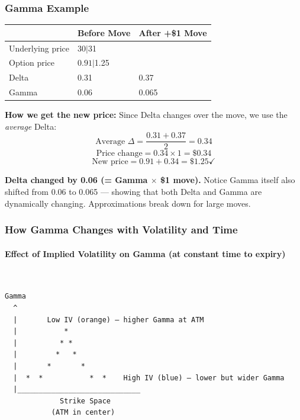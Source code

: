 \documentclass[12pt,openany]{book}
\begin{document}
\subsubsection{Gamma Example}

\begin{center}
\scriptsize
\setlength{\tabcolsep}{3pt}
\begin{tabular}{|L{4.1cm}|L{4.1cm}|L{4.1cm}|}
\hline
\textbf{} & \textbf{Before Move} & \textbf{After +\$1 Move} \\
\hline
Underlying price & \(30 | \)31 &  \\
\hline
Option price & \(0.91 | \)1.25 &  \\
\hline
Delta & 0.31 & 0.37 \\
\hline
Gamma & 0.06 & 0.065 \\
\hline
\end{tabular}
\end{center}

\textbf{How we get the new price:}
Since Delta changes over the move, we use the \emph{average} Delta:
\[
\text{Average } \Delta = \frac{0.31 + 0.37}{2} = 0.34
\]
\[
\text{Price change} = 0.34 \times 1 = \$0.34
\]
\[
\text{New price} = 0.91 + 0.34 = \$1.25 \checkmark
\]

\textbf{Delta changed by 0.06 (= Gamma \(\times\) \$1 move).} Notice Gamma itself also shifted from 0.06 to 0.065 — showing that both Delta and Gamma are dynamically changing. Approximations break down for large moves.

\subsubsection{How Gamma Changes with Volatility and Time}

\paragraph{Effect of Implied Volatility on Gamma (at constant time to expiry)}\mbox{}\\

\begin{center}
\begin{Verbatim}[fontsize=\small,breaklines=true]
Gamma
  ^
  |       Low IV (orange) — higher Gamma at ATM
  |           *
  |          * *
  |         *   *
  |       *       *
  |  *  *           *  *    High IV (blue) — lower but wider Gamma
  |_____________________________
             Strike Space
           (ATM in center)
\end{Verbatim}
\end{center}
\end{document}
